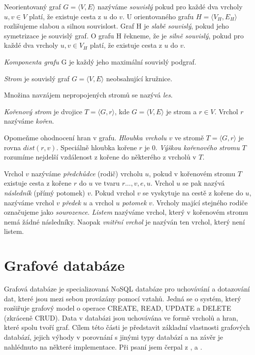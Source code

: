 \documentclass[
  program=infoi,
  biblatex=true,
  sourcecodes=true,
  figures=true,
  glossaries=false,
  index
]{kidiplom}
\begin{document}
\begin{definition}
Neorientovaný graf $G = \langle V,E\rangle$ nazýváme \textit{souvislý} pokud pro každé dva vrcholy $ u,v \in V $ platí, že existuje cesta z $u$ do $v$. U orientovaného grafu $H = \langle V_H,E_H \rangle$ rozlišujeme slabou a silnou souvislost. Graf H je \textit{slabě souvislý}, pokud jeho symetrizace je souvislý graf. O grafu H řekneme, že je \textit{silně souvislý}, pokud pro každé dva vrcholy $ u,v \in V_H $ platí, že existuje cesta z $u$ do $v$.
\end{definition}

\textit{Komponenta grafu} G je každý jeho maximální souvislý podgraf.

\begin{definition}[Strom]
\textit{Strom} je souvislý graf $G = \langle V,E\rangle$ neobsahující kružnice.
\end{definition}

Množina navzájem nepropojených stromů se nazývá \textit{les}.

\begin{definition}
\textit{Kořenový strom} je dvojice $T=\langle G,r \rangle$, kde $G= \langle V,E \rangle $ je strom a $r \in V$. Vrchol $r$ nazýváme \textit{kořen}.
\end{definition}

Opomeňme ohodnocení hran v grafu. \textit{Hloubka vrcholu $v$} ve stromě $T=\langle G,r \rangle$ je rovna $dist(r,v)$. Speciálně hloubka kořene $r$ je 0. \textit{Výškou kořenového stromu $T$} rozumíme nejdelší vzdálenost z kořene do některého z vrcholů v $T$.

Vrchol $v$ nazýváme \textit{předchůdce} (rodič) vrcholu $u$, pokud v kořenovém stromu $T$ existuje cesta z kořene $r$ do $u$ ve tvaru $r \ldots , v, e, u$. Vrchol $u$ se pak nazývá \textit{následník} (přímý potomek) $v$. Pokud vrchol $v$ se vyskytuje na cestě z kořene do $u$, nazýváme vrchol $v$ \textit{předek} $u$ a vrchol $u$ \textit{potomek} $v$. Vrcholy mající stejného rodiče označujeme jako \textit{sourozence}. \textit{Listem} nazýváme vrchol, který v kořenovém stromu nemá žádné následníky. Naopak \textit{vnitřní vrchol} je nazýván ten vrchol, který není listem. 

\section{Grafové databáze}
Grafová databáze je specializovaná NoSQL databáze pro uchovávání a dotazování dat, které jsou mezi sebou provázány pomocí vztahů. Jedná se o systém, který rozšiřuje grafový model o operace CREATE, READ, UPDATE a DELETE (zkráceně CRUD). Data v databázi jsou uchovávána ve formě vrcholů  a hran, které spolu tvoří graf. Cílem této části je představit základní vlastnosti grafových databází, jejich výhody v porovnání s jinými typy databází a na závěr je nahlédnuto na některé implementace. Při psaní jsem čerpal z \cite{graphDatabases}, \cite{influxdata} a \cite{ionos}.
\end{document}
